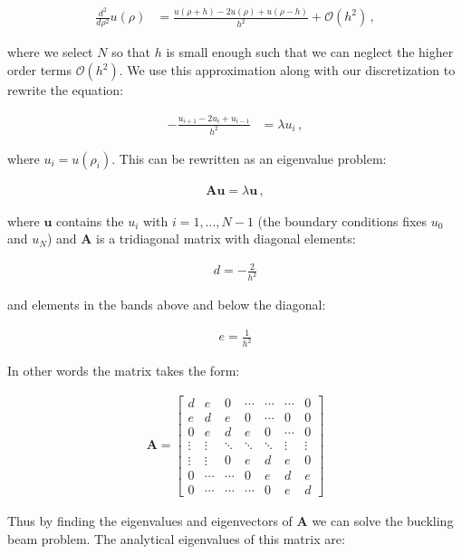 \documentclass[reprint,english,notitlepage]{revtex4-1}  %
\begin{document}
\begin{align*}
\frac{d^2}{d\rho^2} u(\rho) &=  \frac{u(\rho+h) - 2u (\rho)  + u(\rho - h) }{h^2} + \mathcal{O}(h^2)  \, ,
\end{align*}

where we select $N$ so that $h$ is small enough such that we can neglect the higher order terms $\mathcal{O}(h^2)$. We use this approximation along with our discretization to rewrite the equation:

\begin{align*}
-\frac{u_{i+1} - 2u_i + u_{i-1}}{h^2} &= \lambda u_i \, ,
\end{align*} 

where $u_i = u(\rho_i)$. This can be rewritten as an eigenvalue problem:

\begin{align*}
\textbf{Au} = \lambda \textbf{u} \, ,
\end{align*}

where $\textbf{u}$ contains the $u_i$ with $i = 1,...,N-1$ (the boundary conditions fixes $u_0$ and $u_N$) and $\textbf{A}$ is a tridiagonal matrix with diagonal elements:

\begin{align*}
d = -\frac{2}{h^2}
\end{align*}

and elements in the bands above and below the diagonal:

\begin{align*}
e = \frac{1}{h^2}
\end{align*}

In other words the matrix takes the form:

\begin{align*}
\textbf{A} = \begin{bmatrix}
d & e & 0 & \cdots  & \cdots & \cdots & 0  \\
e & d & e & 0 & \cdots & 0 & 0 \\
0 & e & d & e & 0 & \cdots & 0 \\
\vdots & \vdots & \ddots & \ddots & \ddots & \vdots &  \vdots \\
\vdots & \vdots & 0 & e & d & e & 0 \\
0 & \cdots & \cdots & 0 & e & d & e \\
0 & \cdots & \cdots & \cdots & 0 & e & d 
\end{bmatrix}
\end{align*}

Thus by finding the eigenvalues and eigenvectors of $\textbf{A}$ we can solve the buckling beam problem. The analytical eigenvalues of this matrix are:
\end{document}
